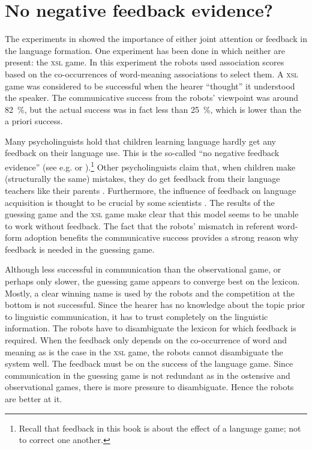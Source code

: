 \section{No negative feedback evidence?}\label{s:disc:feed}

The experiments in  showed the importance of either joint attention or feedback in the language formation. One experiment has been done in which neither are present: the {\scshape xsl} game. In this experiment the robots used association scores based on the co-occurrences of word-meaning associations to select them. A {\scshape xsl} game was considered to be successful when the hearer ``thought'' it understood the speaker. The communicative success from the robots' viewpoint was around 82~\%, but the actual success was in fact less than 25~\%, which is lower than the a priori success. 

\newpage
Many psycholinguists hold that children learning language hardly get any feedback on their language use. This is the so-called ``no negative feedback evidence'' (see e.g. \citealt{braine:1971} or \citealt{bowerman:1988}).\footnote{Recall that feedback in this book is about the effect of a language game; not to correct one another.} Other psycholinguists claim that, when children make (structurally the same) mistakes, they do get feedback from their language teachers like their parents \citep{demetrasetal:1986}. Furthermore, the influence of feedback on language acquisition is thought to be crucial by some scientists \citep{clancey:1997,demetrasetal:1986,clarkclark:1977,tomasellobarton:1994}. The results of the guessing game and the {\scshape xsl} game make clear that this model seems to be unable to work without feedback. The fact that the robots' mismatch in referent word-form adoption benefits the communicative success provides a strong reason why feedback is needed in the guessing game.

Although less successful in communication than the observational game, or perhaps only slower, the guessing game appears to converge best on the lexicon. Mostly, a clear winning name is used by the robots and the competition at the bottom is not successful. Since the hearer has no knowledge about the topic prior to linguistic communication, it has to trust completely on the linguistic information. The robots have to disambiguate the lexicon for which feedback is required. When the feedback only depends on the co-occurrence of word and meaning as is the case in the {\scshape xsl} game, the robots cannot disambiguate the system well. The feedback must be on the success of the language game. Since communication in the guessing game is not redundant as in the ostensive and observational games, there is more pressure to disambiguate. Hence the robots are better at it.

